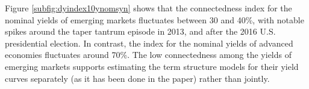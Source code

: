\begin{appendices}

Figure \ref{subfig:dyindex10ynomsyn} %
shows that the connectedness index for the nominal yields of emerging markets fluctuates between 30 and 40\%, %
with notable spikes around the taper tantrum episode in 2013,
and after the 2016 U.S. presidential election.
In contrast, the index for the nominal yields of advanced economies fluctuates around 70\%. %
The low connectedness among the yields of emerging markets supports estimating the term structure models for their yield curves separately (as it has been done in the paper) rather than jointly.


\end{appendices}
